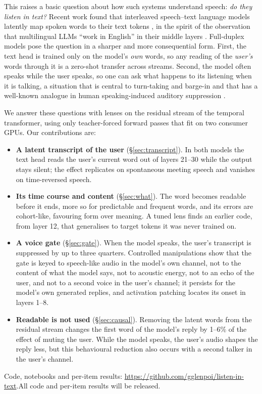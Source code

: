 \documentclass[11pt,a4paper]{article}
\begin{document}
This raises a basic question about how such systems understand speech: \emph{do they listen in text?}
Recent work found that interleaved speech--text language models latently map spoken words to their text tokens \citep{sternberg2026interleaved}, in the spirit of the observation that multilingual LLMs ``work in English'' in their middle layers \citep{wendler2024llamas}.
Full-duplex models pose the question in a sharper and more consequential form.
First, the text head is trained only on the model's \emph{own} words, so any reading of the \emph{user's} words through it is a zero-shot transfer across streams.
Second, the model often speaks while the user speaks, so one can ask what happens to its listening when it is talking, a situation that is central to turn-taking and barge-in \citep{lin2025fdb,lin2025fdb2} and that has a well-known analogue in human speaking-induced auditory suppression \citep{houde2002modulation}.

We answer these questions with lenses on the residual stream of the temporal transformer, using only teacher-forced forward passes that fit on two consumer GPUs.
Our contributions are:
\begin{itemize}
\setlength\itemsep{0pt}
\item \textbf{A latent transcript of the user} (\S\ref{sec:transcript}). In both models the text head reads the user's current word out of layers 21--30 while the output stays silent; the effect replicates on spontaneous meeting speech and vanishes on time-reversed speech.
\item \textbf{Its time course and content} (\S\ref{sec:what}). The word becomes readable before it ends, more so for predictable and frequent words, and its errors are cohort-like, favouring form over meaning. A tuned lens finds an earlier code, from layer 12, that generalises to target tokens it was never trained on.
\item \textbf{A voice gate} (\S\ref{sec:gate}). When the model speaks, the user's transcript is suppressed by up to three quarters. Controlled manipulations show that the gate is keyed to speech-like audio in the model's own channel, not to the content of what the model says, not to acoustic energy, not to an echo of the user, and not to a second voice in the user's channel; it persists for the model's own generated replies, and activation patching locates its onset in layers 1--8.
\item \textbf{Readable is not used} (\S\ref{sec:causal}). Removing the latent words from the residual stream changes the first word of the model's reply by 1--6\% of the effect of muting the user. While the model speaks, the user's audio shapes the reply less, but this behavioural reduction also occurs with a second talker in the user's channel.
\end{itemize}
\ifdefined\PREPRINT Code, notebooks and per-item results: \url{https://github.com/gglenpoi/listen-in-text}.\else All code and per-item results will be released.\fi
\end{document}

